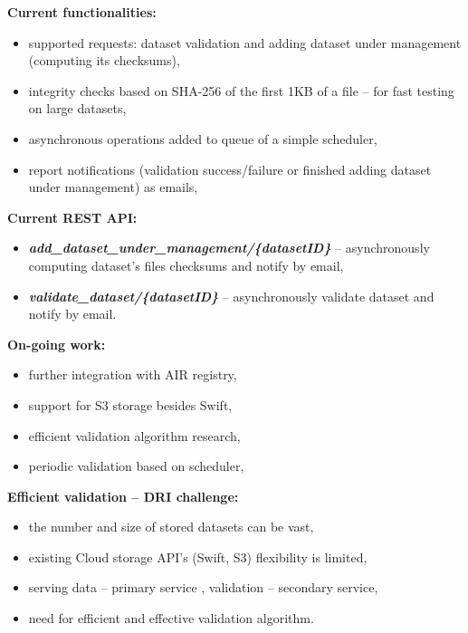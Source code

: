 \documentclass{beamer}
\begin{document}
\begin{frame}
\begin{block}{\textbf{Current functionalities:}}
\begin{itemize}
	\item supported requests: dataset validation and adding dataset under management (computing its checksums),
	\item integrity checks based on SHA-256 of the first 1KB of a file -- for fast testing on large datasets,
	\item asynchronous operations added to queue of a simple scheduler,
	\item report notifications (validation success/failure or finished adding dataset under management) as emails,
\end{itemize}
\end{block}
\begin{exampleblock}{\textbf{Current REST API:}}
\begin{itemize}
	\item \textbf{\textit{add\_dataset\_under\_management/\{datasetID\}}} -- asynchronously computing dataset's files checksums and notify by email,
	\item \textbf{\textit{validate\_dataset/\{datasetID\}}} -- asynchronously validate dataset and notify by email.
\end{itemize}
\end{exampleblock}
\end{frame}

\begin{frame}
\begin{block}{\textbf{On-going work:}}
\begin{itemize}
	\item further integration with AIR registry,
	\item support for S3 storage besides Swift,
	\item efficient validation algorithm research,
	\item periodic validation based on scheduler,
\end{itemize}
\end{block}
\begin{exampleblock}{\textbf{Efficient validation -- DRI challenge:}}
\begin{itemize}
	\item the number and size of stored datasets can be vast,
	\item existing Cloud storage API's (Swift, S3) flexibility is limited,
	\item serving data -- primary service , validation -- secondary service,
	\item need for efficient and effective validation algorithm.
\end{itemize}
\end{exampleblock}
\end{frame}

%
%
\end{document}
